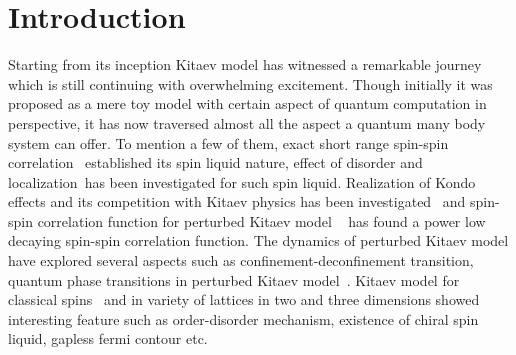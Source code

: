 \documentclass[aps,amsmath,twocolumn,amssymb,floatfix,showpacs,superscriptaddress,nofootinbib,longbibliography]{revtex4-1}
\begin{document}
\date{\today}

\maketitle



\section{Introduction}
 Starting from its inception Kitaev model\cite{kitaev-2006} has witnessed a remarkable journey which is still continuing with overwhelming excitement. Though initially it was proposed as a mere toy model with certain aspect of quantum computation in perspective, it has now traversed almost all the aspect a quantum many body system can offer. To mention a few of them, exact short range  spin-spin correlation~\cite{smandal-2007} established its spin liquid nature, effect of disorder and localization~\cite{kao-2021,nasu-2020}has been investigated for such spin liquid. Realization of Kondo effects and its competition with Kitaev physics has been investigated~\cite{tathagata-2020} and spin-spin correlation function for perturbed  Kitaev model ~\cite{tikhonov-2011,lunkin-2019} has found a power low decaying spin-spin correlation function. The dynamics of perturbed Kitaev model have explored several aspects such as confinement-deconfinement transition,  quantum phase transitions in perturbed Kitaev model~\cite{saptarshi-2011,animesh-2020,animesh-2021, knolle-2018}. Kitaev model for classical 
spins~\cite{baskaran-2008,samarth-2010} and in variety of lattices in two and three dimensions \cite{kivelson-2007,vala-csl-2010,naveen-2008,eschmann-2020} showed interesting feature such as order-disorder mechanism, existence of chiral spin liquid, gapless fermi contour etc. \\
\indent
\end{document}
